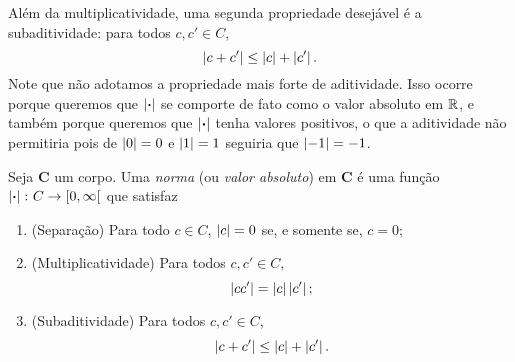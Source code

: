 Além da multiplicatividade, uma segunda propriedade desejável é a subaditividade: para todos $c,c' \in C$,
	\begin{equation*}
	\left\vert{c+c'}\right\vert \leq \left\vert{c}\right\vert + \left\vert{c'}\right\vert.
	\end{equation*}
Note que não adotamos a propriedade mais forte de aditividade. Isso ocorre porque queremos que $\left\vert{\bm{\cdot}}\right\vert$ se comporte de fato como o valor absoluto em $\mathbb{R}$, e também porque queremos que $\left\vert{\bm{\cdot}}\right\vert$ tenha valores positivos, o que a aditividade não permitiria pois de $\left\vert{0}\right\vert=0$ e $\left\vert{1}\right\vert=1$ seguiria que $\left\vert{-1}\right\vert=-1$.


\begin{definition}
Seja $\bm C$ um corpo. Uma \emph{norma} (ou \emph{valor absoluto}) em $\bm C$ é uma função $\left\vert{\bm{\cdot}}\right\vert\colon C \to \left[{0},{\infty}\right[$ que satisfaz
	\begin{enumerate}
	\item (Separação) Para todo $c \in C$, $\left\vert{c}\right\vert=0$ se, e somente se, $c=0$;
	\item (Multiplicatividade) Para todos $c,c' \in C$,
		\begin{equation*}
		\left\vert{cc'}\right\vert = \left\vert{c}\right\vert\left\vert{c'}\right\vert;
		\end{equation*}
	\item (Subaditividade) Para todos $c,c' \in C$,
		\begin{equation*}
		\left\vert{c+c'}\right\vert \leq \left\vert{c}\right\vert + \left\vert{c'}\right\vert.
		\end{equation*}
	\end{enumerate}
\end{definition}

